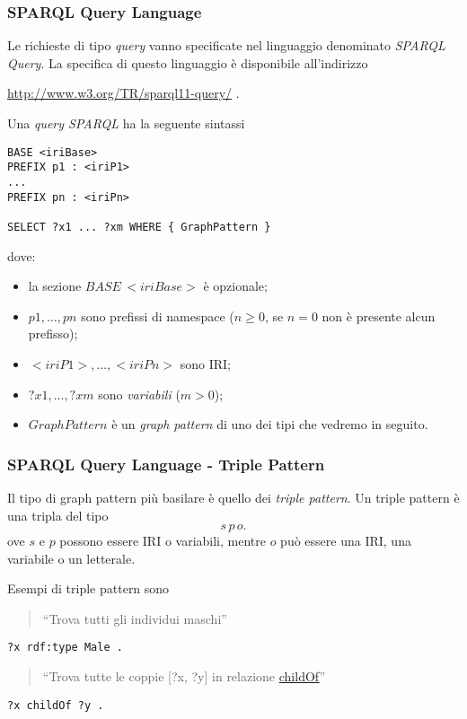 \documentclass[8pt]{beamer}
\begin{document}
\begin{frame}[fragile]
\frametitle{SPARQL Query Language}
Le richieste di tipo \emph{query} vanno specificate nel linguaggio
denominato \emph{SPARQL Query}.
%
La specifica di questo linguaggio \`e disponibile all'indirizzo
\begin{center}
 \url{http://www.w3.org/TR/sparql11-query/} .
\end{center}

Una \emph{query SPARQL} ha la seguente sintassi
\begin{Verbatim}[fontsize=\small]
BASE <iriBase>
PREFIX p1 : <iriP1>
...
PREFIX pn : <iriPn>

SELECT ?x1 ... ?xm WHERE { GraphPattern }
\end{Verbatim}
dove: 
\begin{itemize}
 \item la sezione $BASE\,<iriBase>$ \`e opzionale;
 \item $p1, \ldots, pn$ sono prefissi di namespace ($n\geq0$, se $n=0$ non \`e presente alcun prefisso);
 \item $<iriP1>, \ldots, <iriPn>$ sono IRI;
 \item $?x1, \ldots, ?xm$ sono \emph{variabili} ($m>0$);
 \item $GraphPattern$ \`e un \emph{graph pattern} di uno dei tipi che vedremo in seguito.
\end{itemize}
\end{frame}

\begin{frame}[fragile]
\frametitle{SPARQL Query Language - Triple Pattern}
Il tipo di graph pattern più basilare \`e quello dei \emph{triple pattern}.
Un triple pattern \`e una tripla del tipo
\[
 s \, p \, o . 
\]
ove $s$ e $p$ possono essere IRI o variabili, mentre $o$ pu\`o essere una
IRI, una variabile o un letterale.
\vspace{\baselineskip}

Esempi di triple pattern sono

\begin{quote}
``Trova tutti gli individui maschi''
\end{quote}
\begin{Verbatim}[fontsize=\small]
?x rdf:type Male . 
\end{Verbatim}

\begin{quote}
``Trova tutte le coppie [?x, ?y] in relazione \url{childOf}''
\end{quote}
\begin{Verbatim}[fontsize=\small]
?x childOf ?y . 
\end{Verbatim}
\end{frame}
\end{document}
